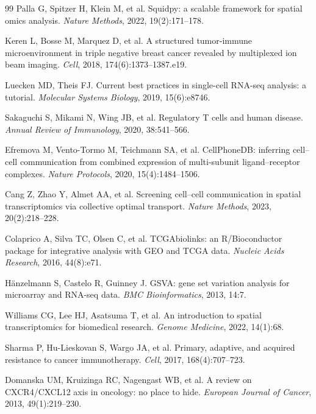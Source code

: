 \documentclass[12pt, a4paper]{ctexart}
\begin{document}
\begin{thebibliography}{99}
Palla G, Spitzer H, Klein M, et al.
Squidpy: a scalable framework for spatial omics analysis.
\textit{Nature Methods}, 2022, 19(2):171--178.

Keren L, Bosse M, Marquez D, et al.
A structured tumor-immune microenvironment in triple negative breast cancer revealed by multiplexed ion beam imaging.
\textit{Cell}, 2018, 174(6):1373--1387.e19.

Luecken MD, Theis FJ.
Current best practices in single-cell RNA-seq analysis: a tutorial.
\textit{Molecular Systems Biology}, 2019, 15(6):e8746.

Sakaguchi S, Mikami N, Wing JB, et al.
Regulatory T cells and human disease.
\textit{Annual Review of Immunology}, 2020, 38:541--566.

Efremova M, Vento-Tormo M, Teichmann SA, et al.
CellPhoneDB: inferring cell--cell communication from combined expression of multi-subunit ligand--receptor complexes.
\textit{Nature Protocols}, 2020, 15(4):1484--1506.

Cang Z, Zhao Y, Almet AA, et al.
Screening cell--cell communication in spatial transcriptomics via collective optimal transport.
\textit{Nature Methods}, 2023, 20(2):218--228.

Colaprico A, Silva TC, Olsen C, et al.
TCGAbiolinks: an R/Bioconductor package for integrative analysis with GEO and TCGA data.
\textit{Nucleic Acids Research}, 2016, 44(8):e71.

Hänzelmann S, Castelo R, Guinney J.
GSVA: gene set variation analysis for microarray and RNA-seq data.
\textit{BMC Bioinformatics}, 2013, 14:7.

Williams CG, Lee HJ, Asatsuma T, et al.
An introduction to spatial transcriptomics for biomedical research.
\textit{Genome Medicine}, 2022, 14(1):68.

Sharma P, Hu-Lieskovan S, Wargo JA, et al.
Primary, adaptive, and acquired resistance to cancer immunotherapy.
\textit{Cell}, 2017, 168(4):707--723.

Domanska UM, Kruizinga RC, Nagengast WB, et al.
A review on CXCR4/CXCL12 axis in oncology: no place to hide.
\textit{European Journal of Cancer}, 2013, 49(1):219--230.


\end{thebibliography}
\end{document}
